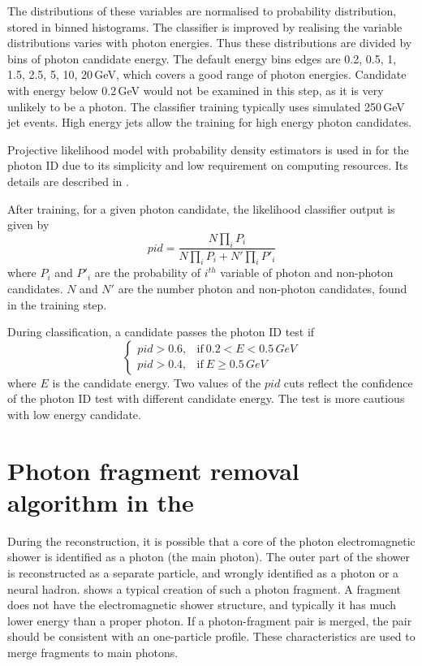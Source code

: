 The distributions of these variables are normalised to probability distribution, stored in binned histograms. The classifier is improved by realising the variable distributions varies with photon energies. Thus these distributions are divided by bins of photon candidate energy. The default energy bins edges are 0.2, 0.5, 1, 1.5, 2.5, 5, 10, 20\,GeV, which covers a good range of photon energies. Candidate with energy below 0.2\,GeV would not be examined in this step, as it is very unlikely to be a photon. The classifier training typically uses simulated 250\,GeV jet events. High energy jets allow the training for high energy photon candidates.

Projective likelihood model  with probability density estimators is used in \pandora for the photon ID due to its simplicity and low requirement on computing resources. Its details are described in .

After training, for a given photon candidate, the likelihood classifier output is given by
\begin{equation}
pid = \frac{N\prod_{i}{P_i}}{N\prod_{i}{P_i} + N'\prod_{i}{P'_i}}
\end{equation}
where $P_i$ and $P'_i$ are the probability of $i^{th}$ variable of photon and non-photon candidates. $N$ and $N'$ are the number photon and non-photon candidates, found in the training step.

During classification, a candidate passes the photon ID test if
\begin{equation}
\begin{cases}
  pid > 0.6, & \text{if}\ 0.2 < E < 0.5\,GeV\\
  pid > 0.4, & \text{if}\ E \geqslant 0.5\,GeV
\end{cases}
\end{equation}
where $E$ is the candidate energy. Two values of the $pid$ cuts reflect the confidence of the photon ID test with different candidate energy. The test is more cautious with low energy candidate.


\section{Photon fragment removal algorithm in the \ECAL}
\label{sec:photonFragRemoval}
During the reconstruction, it is possible that a core of the photon electromagnetic shower is identified as a photon (the main photon). The outer part of the shower is reconstructed as a separate particle, and wrongly identified as a photon or a neural hadron.  shows a typical creation of such a photon fragment. A fragment does not have the electromagnetic shower structure, and typically it has much lower energy than a proper photon. If a photon-fragment pair is merged, the pair should be consistent with an one-particle profile. These characteristics are used to merge fragments to main photons.

